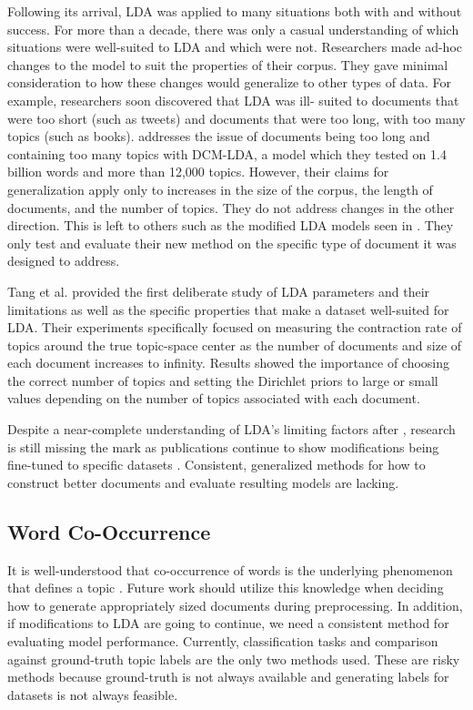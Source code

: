 \documentclass[letterpaper, 10 pt, conference]{ieeeconf}  %
\begin{document}
Following its arrival, LDA was applied to many situations both with and without success. For more than a decade, there was only a casual understanding of which situations were well-suited to LDA and which were not. Researchers made ad-hoc changes to the model to suit the properties of their corpus. They gave minimal consideration to how these changes would generalize to other types of data. For example, researchers soon discovered that LDA was ill- suited to documents that were too short (such as tweets) and documents that were too long, with too many topics (such as books). \cite{mimno2007organizing} addresses the issue of documents being too long and containing too many topics with DCM-LDA, a model which they tested on 1.4 billion words and more than 12,000 topics. However, their claims for generalization apply only to increases in the size of the corpus, the length of documents, and the number of topics. They do not address changes in the other direction. This is left to others such as the modified LDA models seen in \cite{zuo2016topic,zhao2011comparing}. They only test and evaluate their new method on the specific type of document it was designed to address.

Tang et al. \cite{tang2014understanding} provided the first deliberate study of LDA parameters and their limitations as well as the specific properties that make a dataset well-suited for LDA. Their experiments specifically focused on measuring the contraction rate of topics around the true topic-space center as the number of documents and size of each document increases to infinity. Results showed the importance of choosing the correct number of topics and setting the Dirichlet priors to large or small values depending on the number of topics associated with each document.

Despite a near-complete understanding of LDA’s limiting factors after \cite{tang2014understanding}, research is still missing the mark as publications continue to show modifications being fine-tuned to specific datasets \cite{zuo2016topic}. Consistent, generalized methods for how to construct better documents and evaluate resulting models are lacking.

\subsection{Word Co-Occurrence}

It is well-understood that co-occurrence of words is the underlying phenomenon that defines a topic \cite{tang2014understanding,zuo2016topic,zhao2011comparing,mimno2007organizing}. Future work should utilize this knowledge when deciding how to generate appropriately sized documents during preprocessing. In addition, if modifications to LDA are going to continue, we need a consistent method for evaluating model performance. Currently, classification tasks and comparison against ground-truth topic labels are the only two methods used. These are risky methods because ground-truth is not always available and generating labels for datasets is not always feasible.
\end{document}
